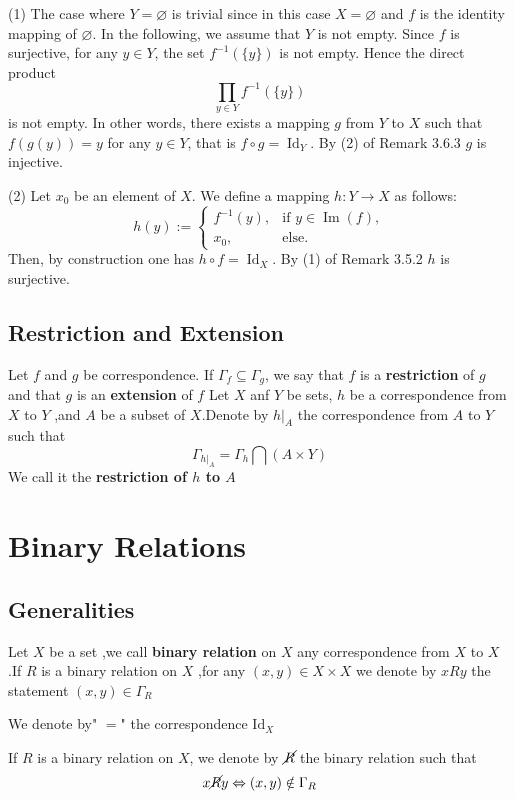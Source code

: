 \documentclass{book}
\begin{document}
\begin{proofenv}
(1) The case where $Y = \varnothing$ is trivial since in this case $X = \varnothing$ and $f$ is the identity mapping of $\varnothing$. In the following, we assume that $Y$ is not empty. Since $f$ is surjective, for any $y \in Y$, the set $f^{-1}(\{y\})$ is not empty. Hence the direct product
\[
\prod_{y \in Y} f^{-1}(\{y\})
\]
is not empty. In other words, there exists a mapping $g$ from $Y$ to $X$ such that $f(g(y)) = y$ for any $y \in Y$, that is $f \circ g = \operatorname{Id}_Y$. By (2) of Remark 3.6.3 $g$ is injective.

(2) Let $x_0$ be an element of $X$. We define a mapping $h : Y \to X$ as follows:
\[
h(y) := 
\begin{cases}
f^{-1}(y), & \text{if } y \in \operatorname{Im}(f), \\
x_0, & \text{else}.
\end{cases}
\]
Then, by construction one has $h \circ f = \operatorname{Id}_X$. By (1) of Remark 3.5.2 $h$ is surjective.
\end{proofenv}
\section{Restriction and Extension}
\begin{definitionenv}
    Let $f$ and $g$ be correspondence. If $\Gamma _f\subseteq \Gamma _g$, we say that $f$ is a \textbf{restriction} of $g$ and that $g$ is an \textbf{extension} of $f$
    \newline
    Let $X$ anf $Y$ be sets, $h$ be a correspondence from $X$ to $Y$ ,and $A$ be a subset of $X$.Denote by $h|_A$ the correspondence from $A$ to $Y$ such that$$\Gamma_{h|_A}=\Gamma_h\bigcap (A\times Y)$$ We call it the \textbf{restriction of $h$ to $A$}
\end{definitionenv}
\chapter{Binary Relations}
\section{Generalities}
\begin{definitionenv}
    Let $X$ be a set ,we call \textbf{binary relation} on $X$ any correspondence from $X$ to $X$ .If $R$ is a binary relation on $X$ ,for any $(x,y)\in X\times X $ we denote by $x R y $ the statement $(x,y)\in \Gamma_R$
\end{definitionenv}
\begin{exampleenv}
    We denote by" $=$" the correspondence $\mathrm{Id}_X$
\end{exampleenv}
\begin{definitionenv}
    If $R$ is a binary relation on $X$, we denote by $\cancel{R} $ the binary relation such that $$x \cancel{R}  y \Leftrightarrow (x,y)\notin \Gamma_R$$
\end{definitionenv}
\end{document}
